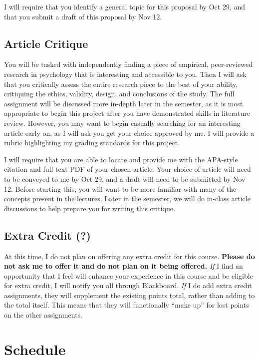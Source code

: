 \documentclass[
  12pt,
  letterpaper,
]{scrartcl}
\begin{document}
I will require that you identify a general topic for this proposal by
Oct 29, and that you submit a draft of this proposal by Nov 12.

\subsection{Article Critique}\label{article-critique}

You will be tasked with independently finding a piece of empirical,
peer-reviewed research in psychology that is interesting and accessible
to you. Then I will ask that you critically assess the entire research
piece to the best of your ability, critiquing the ethics, validity,
design, and conclusions of the study. The full assignment will be
discussed more in-depth later in the semester, as it is most appropriate
to begin this project after you have demonstrated skills in literature
review. However, you may want to begin casually searching for an
interesting article early on, as I will ask you get your choice approved
by me. I will provide a rubric highlighting my grading standards for
this project.

I will require that you are able to locate and provide me with the
APA-style citation and full-text PDF of your chosen article. Your choice
of article will need to be conveyed to me by Oct 29, and a draft will
need to be submitted by Nov 12. Before starting this, you will want to
be more familiar with many of the concepts present in the lectures.
Later in the semester, we will do in-class article discussions to help
prepare you for writing this critique.

\subsection{Extra Credit (?)}\label{extra-credit}

At this time, I do not plan on offering any extra credit for this
course. \textbf{Please do not ask me to offer it and do not plan on it
being offered.} \emph{If} I find an opportunity that I feel will enhance
your experience in this course and be eligible for extra credit, I will
notify you all through Blackboard. \emph{If} I do add extra credit
assignments, they will supplement the existing points total, rather than
adding to the total itself. This means that they will functionally
``make up'' for lost points on the other assignments.

\section{Schedule}\label{schedule}
\end{document}
